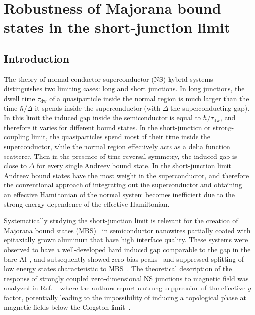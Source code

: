 \chapter{Robustness of Majorana bound states in the short-junction limit}
\label{ch:shortjunction}


\newpage
\noindent

\section{Introduction}
The theory of normal conductor-superconductor (NS) hybrid systems distinguishes two limiting cases: long and short junctions.
In long junctions, the dwell time $\tau_\textrm{dw}$ of a quasiparticle inside the normal region is much larger than the time $\hbar/\Delta$ it spends inside the superconductor (with $\Delta$ the superconducting gap).
In this limit the induced gap inside the semiconductor is equal to $\hbar/\tau_{\textrm{dw}}$, and therefore it varies for different bound states.
In the short-junction or strong-coupling limit, the quasiparticles spend most of their time inside the superconductor, while the normal region effectively acts as a delta function scatterer.
Then in the presence of time-reversal symmetry, the induced gap is close to $\Delta$ for every single Andreev bound state.
In the short-junction limit Andreev bound states have the most weight in the superconductor, and therefore the conventional approach of integrating out the superconductor and obtaining an effective Hamiltonian of the normal system becomes inefficient due to the strong energy dependence of the effective Hamiltonian.

Systematically studying the short-junction limit is relevant for the creation of Majorana bound states (MBS)~\cite{Qi2011, Leijnse2012, Alicea2012, Beenakker2013, Elliott2015} in semiconductor nanowires\cite{Lutchyn2010, Oreg2010} partially coated with epitaxially grown aluminum that have high interface quality.
These systems were observed to have a well-developed hard induced gap comparable to the gap in the bare Al~\cite{Chang2015}, and subsequently showed zero bias peaks~\cite{Deng2016} and suppressed splitting of low energy states characteristic to MBS~\cite{Albrecht2016}.
The theoretical description of the response of strongly coupled zero-dimensional NS junctions to magnetic field was analyzed in Ref.~\cite{Cole2015}, where the authors report a strong suppression of the effective $g$ factor, potentially leading to the impossibility of inducing a topological phase at magnetic fields below the Clogston limit~\cite{Clogston1962}.

